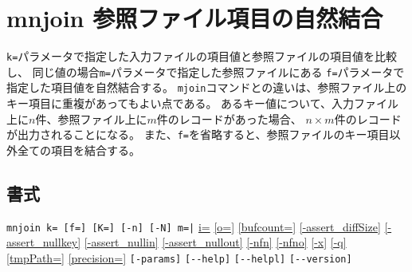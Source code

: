 
%

\section{mnjoin 参照ファイル項目の自然結合\label{sect:mnjoin}}
\verb|k=|パラメータで指定した入力ファイルの項目値と参照ファイルの項目値を比較し、
同じ値の場合\verb|m=|パラメータで指定した参照ファイルにある
\verb|f=|パラメータで指定した項目値を自然結合する。 
\verb|mjoin|コマンドとの違いは、参照ファイル上のキー項目に重複があってもよい点である。
あるキー値について、入力ファイル上に$n$件、参照ファイル上に$m$件のレコードがあった場合、
$n\times m$件のレコードが出力されることになる。
また、\verb|f=|を省略すると、参照ファイルのキー項目以外全ての項目を結合する。

\subsection*{書式}
\verb/mnjoin k= [f=] [K=] [-n] [-N] m=|/ 
\hyperref[sect:option_i]{i=}
\hyperref[sect:option_o]{[o=]}
\hyperref[sect:option_bufcount]{[bufcount=]} 
\hyperref[sect:option_assert_diffSize]{[-assert\_diffSize]}
\hyperref[sect:option_assert_nullkey]{[-assert\_nullkey]}
\hyperref[sect:option_assert_nullin]{[-assert\_nullin]}
\hyperref[sect:option_assert_nullout]{[-assert\_nullout]}
\hyperref[sect:option_nfn]{[-nfn]} 
\hyperref[sect:option_nfno]{[-nfno]}  
\hyperref[sect:option_x]{[-x]}
\hyperref[sect:option_q]{[-q]}
\hyperref[sect:option_option_tmppath]{[tmpPath=]}
\hyperref[sect:option_precision]{[precision=]}
\verb|[-params]|
\verb|[--help]|
\verb|[--helpl]|
\verb|[--version]|\\

